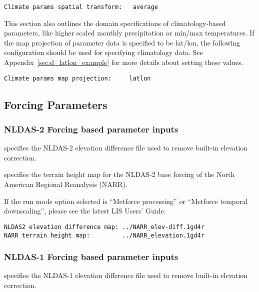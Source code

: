 \begin{Verbatim}[frame=single]
Climate params spatial transform:   average
 \end{Verbatim}

 
 This section also outlines the domain specifications of
 climatology-based parameters, like higher scaled monthly
 precipitation or min/max temperatures.
 If the map projection of parameter data is specified to be lat/lon,
 the following configuration should be used for specifying
 climatology data.
 See Appendix~\ref{sec:d_latlon_example} for more details about
 setting these values.
 

 \begin{Verbatim}[frame=single]
Climate params map projection:     latlon
 \end{Verbatim}



 
 \subsection{Forcing Parameters} \label{ssec:forcings}
 

 
 \subsubsection{NLDAS-2 Forcing based parameter inputs}

  specifies the NLDAS-2 elevation 
 difference file used to remove built-in elevation correction.  

  specifies the terrain height map
 for the NLDAS-2 base forcing of the North American Regional
 Reanalysis (NARR).

 If the run mode option selected is ``Metforce processing'' or
 ``Metforce temporal downscaling'', please see the latest LIS Users'
 Guide.

 

 \begin{Verbatim}[frame=single]
NLDAS2 elevation difference map: ../NARR_elev-diff.1gd4r
NARR terrain height map:         ../NARR_elevation.1gd4r
 \end{Verbatim}

 
 \subsubsection{NLDAS-1 Forcing based parameter inputs}

  specifies the NLDAS-1 elevation 
 difference file used to remove built-in elevation correction.  

